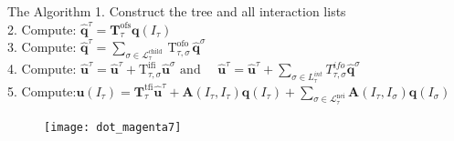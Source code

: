   \begin{frame}{The Algorithm}
  1. Construct the tree and all interaction lists\\
  \vspace{3mm}
  2. Compute: $\hat{\mathbf{q}}^{\tau}=\mathbf{T}_{\tau}^{\mathrm{ofs}} \mathbf{q}\left(I_{\tau}\right)$\\
  \vspace{3mm}
  3. Compute: $\hat{\mathbf{q}}^{\tau}=\sum_{\sigma \in \mathcal{L}_{\tau}^{\text {child }}} \mathrm{T}_{\tau, \sigma}^{\text {ofo }} \hat{\mathbf{q}}^{\sigma}$\\
  \vspace{3mm}
  4. Compute: $\hat{\mathbf{u}}^{\tau}=\hat{\mathbf{u}}^{\tau}+\mathrm{T}_{\tau, \sigma}^{\mathrm{ifi}} \hat{\mathbf{u}}^{\sigma} \text { and } \quad \hat{\boldsymbol{u}}^{\tau}=\hat{\boldsymbol{u}}^{\tau}+\sum_{\sigma \in L_{\tau}^{i n t}} T_{\tau, \sigma}^{i f o} \widehat{\boldsymbol{q}}^{\sigma}$\\
  \vspace{3mm}
  5. Compute:$\mathbf{u}\left(I_{\tau}\right)=\mathbf{T}_{\tau}^{\mathrm{tfi}}\hat{\mathbf{u}}^{\tau}+\mathbf{A}\left(I_{\tau}, I_{\tau}\right) \mathbf{q}\left(I_{\tau}\right)+\sum_{\sigma \in \mathcal{L}_{\tau}^{\mathrm{nei}}} \mathbf{A}\left(I_{\tau}, I_{\sigma}\right) \mathbf{q}\left(I_{\sigma}\right)$\\
  \vspace{3mm}
  \begin{figure}[htp]
      \texttt{[image: dot\_magenta7]}
      \label{fig:particles}
  \end{figure}

\end{frame}

